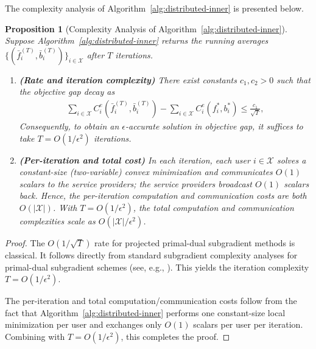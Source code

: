 \documentclass[lettersize,journal]{IEEEtran}
\newtheorem{proposition}{Proposition}
\begin{document}
The complexity analysis of Algorithm~\ref{alg:distributed-inner} is presented below.
\begin{proposition}[Complexity Analysis of Algorithm~\ref{alg:distributed-inner}]
\label{prop:inner_complexity}
Suppose Algorithm~\ref{alg:distributed-inner} returns the running averages
$\{(\bar f_i^{(T)},\bar b_i^{(T)})\}_{i\in\mathcal{X}}$ after $T$ iterations.

\begin{enumerate}
\item \textbf{(Rate and iteration complexity)} There exist constants $c_1,c_2>0$ such that the objective gap decay as
\begin{align*}
    \sum_{i\in\mathcal{X}} C_i^e(\bar f_i^{(T)},\bar b_i^{(T)}) - \sum_{i\in\mathcal{X}} C_i^e(f_i^*,b_i^*)
\le \frac{c_1}{\sqrt{T}},
\end{align*}
Consequently, to obtain an $\epsilon$-accurate solution in objective gap, it suffices to take
$T=O(1/\epsilon^2)$ iterations.

\item \textbf{(Per-iteration and total cost)} In each iteration, each user $i\in\mathcal{X}$ solves a constant-size
(two-variable) convex minimization and communicates $O(1)$ scalars to the service providers; the service providers broadcast $O(1)$ scalars back. Hence, the per-iteration computation and communication costs are both $O(|\mathcal{X}|)$.
With $T=O(1/\epsilon^2)$, the total computation and communication complexities scale as $O(|\mathcal{X}|/\epsilon^2)$.
\end{enumerate}
\end{proposition}

\begin{proof}
The $O(1/\sqrt{T})$ rate for projected primal-dual subgradient methods is classical.
It follows directly from standard subgradient complexity analyses for primal-dual subgradient schemes (see, e.g.,
\cite{nedic2009subgradient,nedic2009approximate,palomar2006tutorial}). This yields the iteration complexity $T=O(1/\epsilon^2)$.

The per-iteration and total computation/communication costs follow from the fact that Algorithm~\ref{alg:distributed-inner}
performs one constant-size local minimization per user and exchanges only $O(1)$ scalars per user per iteration. Combining
with $T=O(1/\epsilon^2)$, this completes the proof.
\end{proof}
\end{document}
